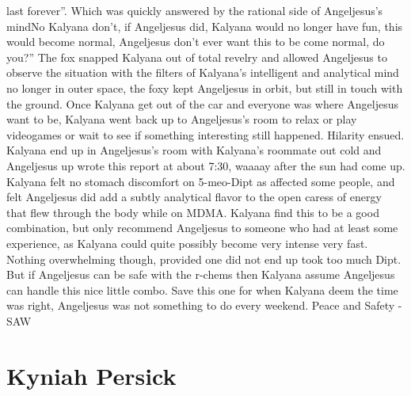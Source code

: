 \documentclass[12pt]{book}
\begin{document}
last forever''. Which was quickly answered by the rational side of Angeljesus's mindNo Kalyana don't, if Angeljesus did, Kalyana would no longer have fun, this would become normal, Angeljesus don't ever want this to be come normal, do you?'' The fox snapped Kalyana out of total revelry and allowed Angeljesus to observe the situation with the filters of Kalyana's intelligent and analytical mind no longer in outer space, the foxy kept Angeljesus in orbit, but still in touch with the ground. Once Kalyana get out of the car and everyone was where Angeljesus want to be, Kalyana went back up to Angeljesus's room to relax or play videogames or wait to see if something interesting still happened. Hilarity ensued. Kalyana end up in Angeljesus's room with Kalyana's roommate out cold and Angeljesus up wrote this report at about 7:30, waaaay after the sun had come up. Kalyana felt no stomach discomfort on 5-meo-Dipt as affected some people, and felt Angeljesus did add a subtly analytical flavor to the open caress of energy that flew through the body while on MDMA. Kalyana find this to be a good combination, but only recommend Angeljesus to someone who had at least some experience, as Kalyana could quite possibly become very intense very fast. Nothing overwhelming though, provided one did not end up took too much Dipt. But if Angeljesus can be safe with the r-chems then Kalyana assume Angeljesus can handle this nice little combo. Save this one for when Kalyana deem the time was right, Angeljesus was not something to do every weekend. Peace and Safety - SAW



\chapter{Kyniah Persick}
\end{document}
